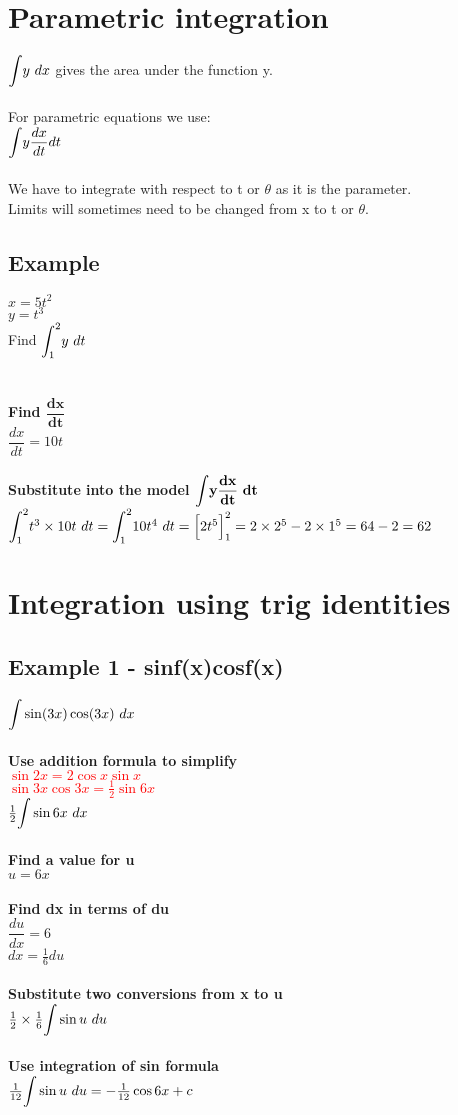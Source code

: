 \documentclass{article}[18pt]
\begin{document}
\section{Parametric integration}
$\mathlarger{\int}y \ dx$ gives the area under the function y.\\
\\
For parametric equations we use:\\
$\mathlarger{\int}y\dfrac{dx}{dt}dt$\\
\\
We have to integrate with respect to t or $\theta$ as it is the parameter.\\
Limits will sometimes need to be changed from x to t or $\theta$.

\subsection{Example}
$x=5t^2$\\
$y=t^3$\\
Find $\mathlarger{\int_1^2}y \ dt$\\
\\
\\
\textbf{Find $\mathbf{\dfrac{dx}{dt}}$}\\
$\dfrac{dx}{dt}=10t$\\
\\
\textbf{Substitute into the model $\mathbf{\mathlarger{\int}y\dfrac{dx}{dt} \ dt}$}\\
$\mathlarger{\int_1^2}t^3\times10t \ dt = \mathlarger{\int_1^2}10t^4 \ dt = \Big[2t^5\Big]^2_1=2\times2^5-2\times1^5=64-2=62$\\
\section{Integration using trig identities}
\subsection{Example 1 - sinf(x)cosf(x)}
$\mathlarger{\int}\sin(3x)\cos(3x) \ dx$\\
\\
\textbf{Use addition formula to simplify}\\
\textcolor{red}{$\sin2x=2\cos x\sin x$}\\
\textcolor{red}{$\sin3x\cos3x=\frac{1}{2}\sin6x$}\\
$\frac{1}{2}\mathlarger{\int}\sin6x \ dx$\\
\\
\textbf{Find a value for u}\\
$u=6x$\\
\\
\textbf{Find dx in terms of du}\\
$\dfrac{du}{dx}=6$\\
$dx=\frac{1}{6}du$\\
\\
\textbf{Substitute two conversions from x to u}\\
$\frac{1}{2}\times\frac{1}{6}\mathlarger{\int}\sin u \ du$\\
\\
\textbf{Use integration of sin formula}\\
$\frac{1}{12}\mathlarger{\int}\sin u \ du=-\frac{1}{12}\cos6x+c$
\newpage
\end{document}
